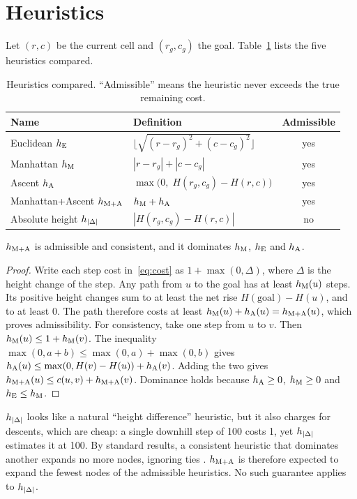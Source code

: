 \section{Heuristics}

Let $(r,c)$ be the current cell and $(r_g,c_g)$ the goal. Table~\ref{tab:heuristics} lists the five heuristics compared.

\begin{table}[ht]
\centering
\caption{Heuristics compared. ``Admissible'' means the heuristic never exceeds the true remaining cost.}
\label{tab:heuristics}
\begin{tabular}{llc}
\toprule
Name & Definition & Admissible \\
\midrule
Euclidean $h_{\mathrm{E}}$ & $\lfloor \sqrt{(r-r_g)^2 + (c-c_g)^2} \rfloor$ & yes \\
Manhattan $h_{\mathrm{M}}$ & $|r-r_g| + |c-c_g|$ & yes \\
Ascent $h_{\mathrm{A}}$ & $\max\bigl(0,\; H(r_g,c_g) - H(r,c)\bigr)$ & yes \\
Manhattan+Ascent $h_{\mathrm{M+A}}$ & $h_{\mathrm{M}} + h_{\mathrm{A}}$ & yes \\
Absolute height $h_{|\Delta|}$ & $|H(r_g,c_g) - H(r,c)|$ & no \\
\bottomrule
\end{tabular}
\end{table}

\begin{proposition}
$h_{\mathrm{M+A}}$ is admissible and consistent, and it dominates $h_{\mathrm{M}}$, $h_{\mathrm{E}}$ and $h_{\mathrm{A}}$.
\end{proposition}
\begin{proof}
Write each step cost in~\eqref{eq:cost} as $1 + \max(0, \Delta)$, where $\Delta$ is the height change of the step. Any path from $u$ to the goal has at least $h_{\mathrm{M}}(u)$ steps. Its positive height changes sum to at least the net rise $H(\text{goal}) - H(u)$, and to at least 0. The path therefore costs at least $h_{\mathrm{M}}(u) + h_{\mathrm{A}}(u) = h_{\mathrm{M+A}}(u)$, which proves admissibility. For consistency, take one step from $u$ to $v$. Then $h_{\mathrm{M}}(u) \le 1 + h_{\mathrm{M}}(v)$. The inequality $\max(0, a+b) \le \max(0,a) + \max(0,b)$ gives $h_{\mathrm{A}}(u) \le \max(0, H(v)-H(u)) + h_{\mathrm{A}}(v)$. Adding the two gives $h_{\mathrm{M+A}}(u) \le c(u,v) + h_{\mathrm{M+A}}(v)$. Dominance holds because $h_{\mathrm{A}} \ge 0$, $h_{\mathrm{M}} \ge 0$ and $h_{\mathrm{E}} \le h_{\mathrm{M}}$.
\end{proof}

$h_{|\Delta|}$ looks like a natural ``height difference'' heuristic, but it also charges for descents, which are cheap: a single downhill step of 100 costs 1, yet $h_{|\Delta|}$ estimates it at 100. By standard results, a consistent heuristic that dominates another expands no more nodes, ignoring ties \citep{pearl1984heuristics,dechter1985generalized}. $h_{\mathrm{M+A}}$ is therefore expected to expand the fewest nodes of the admissible heuristics. No such guarantee applies to $h_{|\Delta|}$.
